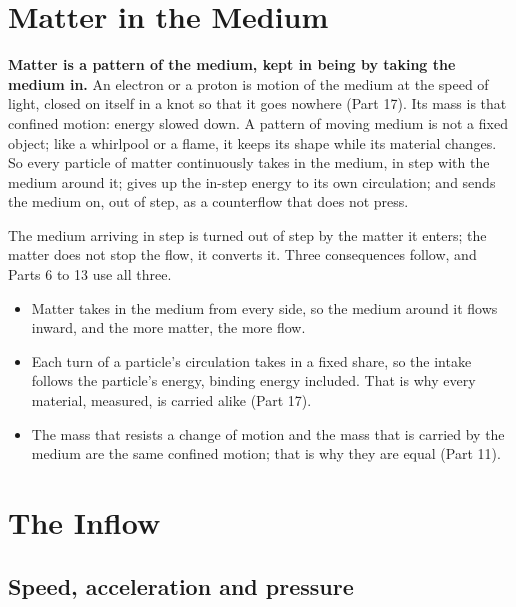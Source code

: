 \documentclass[11pt,a4paper]{article}
\begin{document}
\section{Matter in the Medium}

\begin{hypbar}
\textbf{Matter is a pattern of the medium, kept in being by taking the medium in.} An electron or a proton is motion of the medium at the speed of light, closed on itself in a knot so that it goes nowhere (Part 17).\footnotemark{} Its mass is that confined motion: energy slowed down. A pattern of moving medium is not a fixed object; like a whirlpool or a flame, it keeps its shape while its material changes. So every particle of matter continuously takes in the medium, in step with the medium around it; gives up the in-step energy to its own circulation; and sends the medium on, out of step, as a counterflow that does not press.
\end{hypbar}

 The medium arriving in step is turned out of step by the matter it enters; the matter does not stop the flow, it converts it. Three consequences follow, and Parts 6 to 13 use all three.
\begin{itemize}
\item {} Matter takes in the medium from every side, so the medium around it flows inward, and the more matter, the more flow.
\item {} Each turn of a particle's circulation takes in a fixed share, so the intake follows the particle's energy, binding energy included. That is why every material, measured, is carried alike (Part 17).
\item {} The mass that resists a change of motion and the mass that is carried by the medium are the same confined motion; that is why they are equal (Part 11).
\end{itemize}

\section{The Inflow}

\subsection{Speed, acceleration and pressure}
\end{document}
